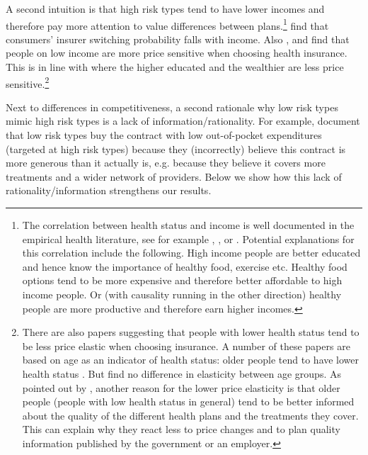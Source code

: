 \documentclass[a4paper,12pt]{article}
\begin{document}
A second intuition is that high risk types tend to have lower incomes and therefore pay more attention to value differences between plans.\footnote{The correlation between health status and income is well documented in the empirical health literature, see for example \cite{fri05}, \cite{fin06}, \cite{gra09} or \cite{mun10}. Potential explanations for this correlation include the following. High income people are better educated and hence know the importance of healthy food, exercise etc. Healthy food options tend to be more expensive and therefore better affordable to high income people. Or (with causality running in the other direction) healthy people are more productive and therefore earn higher incomes.} \cite{hogan2017} find that consumers' insurer switching probability falls with income. Also \cite{Atherly2004}, \cite{Auerbach2006} and \cite{SALTZMAN2019197} find that people on low income are more price sensitive when choosing health insurance. This is in line with \cite{Royalty99} where the higher educated and the wealthier are less price sensitive.\footnote{There are also papers suggesting that people with lower health status tend to be less price elastic when choosing insurance. A number of these papers are based on age as an indicator of health status: older people tend to have lower health status \citep{STROMBOM200289,Royalty99}. But \cite{Costa_2003} find no difference in elasticity between age groups. As pointed out by \cite{BEAULIEU200243}, another reason for the lower price elasticity is that older people (people with low health status in general) tend to be better informed about the quality of the different health plans and the treatments they cover. This can explain why they react less to price changes and to plan quality information published by the government or an employer.}

Next to differences in competitiveness, a second rationale why low risk types mimic high risk types is a lack of information/rationality. For example, \cite{handel-2015-healt-insur-human} document that low risk types buy the contract with low out-of-pocket expenditures (targeted at high risk types) because they (incorrectly) believe this contract is more generous than it actually is, e.g. because they believe it covers more treatments and a wider network of providers. Below we show how this lack of rationality/information strengthens our results.
\end{document}
